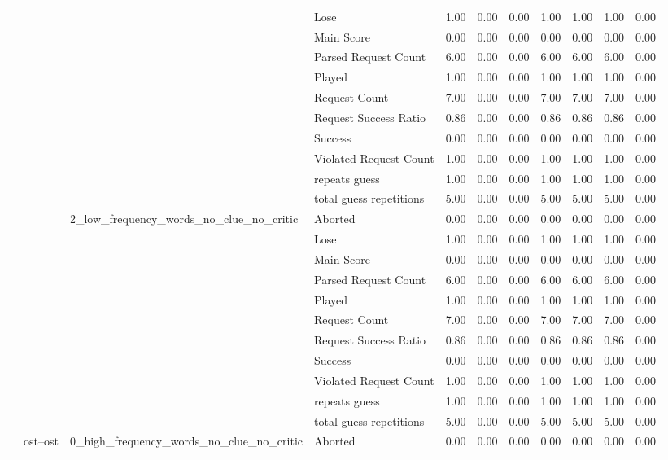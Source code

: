 \begin{tabular}{llllrrrrrrr}
 &  &  & Lose & 1.00 & 0.00 & 0.00 & 1.00 & 1.00 & 1.00 & 0.00 \\
 &  &  & Main Score & 0.00 & 0.00 & 0.00 & 0.00 & 0.00 & 0.00 & 0.00 \\
 &  &  & Parsed Request Count & 6.00 & 0.00 & 0.00 & 6.00 & 6.00 & 6.00 & 0.00 \\
 &  &  & Played & 1.00 & 0.00 & 0.00 & 1.00 & 1.00 & 1.00 & 0.00 \\
 &  &  & Request Count & 7.00 & 0.00 & 0.00 & 7.00 & 7.00 & 7.00 & 0.00 \\
 &  &  & Request Success Ratio & 0.86 & 0.00 & 0.00 & 0.86 & 0.86 & 0.86 & 0.00 \\
 &  &  & Success & 0.00 & 0.00 & 0.00 & 0.00 & 0.00 & 0.00 & 0.00 \\
 &  &  & Violated Request Count & 1.00 & 0.00 & 0.00 & 1.00 & 1.00 & 1.00 & 0.00 \\
 &  &  & repeats guess & 1.00 & 0.00 & 0.00 & 1.00 & 1.00 & 1.00 & 0.00 \\
 &  &  & total guess repetitions & 5.00 & 0.00 & 0.00 & 5.00 & 5.00 & 5.00 & 0.00 \\
\cline{3-11}
 &  & \multirow[t]{11}{*}{2_low_frequency_words_no_clue_no_critic} & Aborted & 0.00 & 0.00 & 0.00 & 0.00 & 0.00 & 0.00 & 0.00 \\
 &  &  & Lose & 1.00 & 0.00 & 0.00 & 1.00 & 1.00 & 1.00 & 0.00 \\
 &  &  & Main Score & 0.00 & 0.00 & 0.00 & 0.00 & 0.00 & 0.00 & 0.00 \\
 &  &  & Parsed Request Count & 6.00 & 0.00 & 0.00 & 6.00 & 6.00 & 6.00 & 0.00 \\
 &  &  & Played & 1.00 & 0.00 & 0.00 & 1.00 & 1.00 & 1.00 & 0.00 \\
 &  &  & Request Count & 7.00 & 0.00 & 0.00 & 7.00 & 7.00 & 7.00 & 0.00 \\
 &  &  & Request Success Ratio & 0.86 & 0.00 & 0.00 & 0.86 & 0.86 & 0.86 & 0.00 \\
 &  &  & Success & 0.00 & 0.00 & 0.00 & 0.00 & 0.00 & 0.00 & 0.00 \\
 &  &  & Violated Request Count & 1.00 & 0.00 & 0.00 & 1.00 & 1.00 & 1.00 & 0.00 \\
 &  &  & repeats guess & 1.00 & 0.00 & 0.00 & 1.00 & 1.00 & 1.00 & 0.00 \\
 &  &  & total guess repetitions & 5.00 & 0.00 & 0.00 & 5.00 & 5.00 & 5.00 & 0.00 \\
\cline{2-11} \cline{3-11}
 & \multirow[t]{33}{*}{ost--ost} & \multirow[t]{11}{*}{0_high_frequency_words_no_clue_no_critic} & Aborted & 0.00 & 0.00 & 0.00 & 0.00 & 0.00 & 0.00 & 0.00 \\

\end{tabular}
